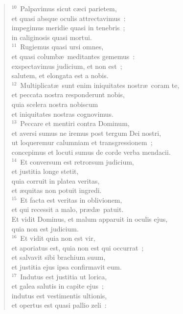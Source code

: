 \begin{verse}
${}^{10}$~Palpavimus sicut c\ae ci parietem,\\ et quasi absque oculis attrectavimus~:\\ impegimus meridie quasi in tenebris~;\\ in caliginosis quasi mortui.\\
${}^{11}$~Rugiemus quasi ursi omnes,\\ et quasi columb\ae\ meditantes gememus~:\\ exspectavimus judicium, et non est~;\\ salutem, et elongata est a nobis.\\
${}^{12}$~Multiplicat\ae\ sunt enim iniquitates nostr\ae\ coram te,\\ et peccata nostra responderunt nobis,\\ quia scelera nostra nobiscum\\ et iniquitates nostras cognovimus.\\
${}^{13}$~Peccare et mentiri contra Dominum,\\ et aversi sumus ne iremus post tergum Dei nostri,\\ ut loqueremur calumniam et transgressionem~;\\ concepimus et locuti sumus de corde verba mendacii.\\
${}^{14}$~Et conversum est retrorsum judicium,\\ et justitia longe stetit,\\ quia corruit in platea veritas,\\ et \ae quitas non potuit ingredi.\\
${}^{15}$~Et facta est veritas in oblivionem,\\ et qui recessit a malo, pr\ae d\ae\ patuit.\\ Et vidit Dominus, et malum apparuit in oculis ejus,\\ quia non est judicium.\\
${}^{16}$~Et vidit quia non est vir,\\ et aporiatus est, quia non est qui occurrat~;\\ et salvavit sibi brachium suum,\\ et justitia ejus ipsa confirmavit eum.\\
${}^{17}$~Indutus est justitia ut lorica,\\ et galea salutis in capite ejus~;\\ indutus est vestimentis ultionis,\\ et opertus est quasi pallio zeli~:\\

\end{verse}
